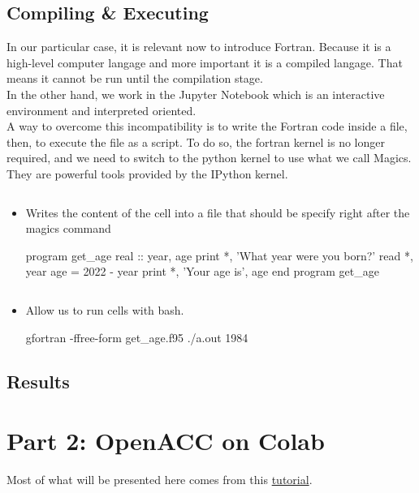 \documentclass[10pt,a4paper]{article}
\begin{document}
\subsection{Compiling \& Executing}
In our particular case, it is relevant now to introduce Fortran. Because it is a high-level computer langage and more important it is a compiled langage. That means it cannot be run until the compilation stage.\\
In the other hand, we work in the Jupyter Notebook which is an interactive environment and interpreted oriented.\\
A way to overcome this incompatibility is to write the Fortran code inside a file, then, to execute the file as a script.
To do so, the fortran kernel is no longer required, and we need to switch to the python kernel to use what we call Magics. They are powerful tools provided by the IPython kernel.
\begin{itemize}

\item
\begin{lstlisting}[language=bash]
%%writefile
\end{lstlisting}
Writes the content of the cell into a file that should be specify right after the magics command
\begin{mylisting}

program get_age
    real :: year, age
    print *, 'What year were you born?'
    read *, year
    age = 2022 - year
    print *, 'Your age is', age
end program get_age
\end{mylisting}
\item 
\begin{lstlisting}[language=bash]
%%bash
\end{lstlisting}
Allow us to run cells with bash.
\begin{mylisting}

gfortran -ffree-form get_age.f95
./a.out
1984
\end{mylisting}
\end{itemize}
\subsection{Results}

\section{Part 2: OpenACC on Colab}
Most of what will be presented here comes from this \href{https://colab.research.google.com/github/ENCCS/OpenACC-CUDA-beginners/blob/colab_gcc/examples/openACC_CUDA_colab.ipynb}{tutorial}.
\end{document}
